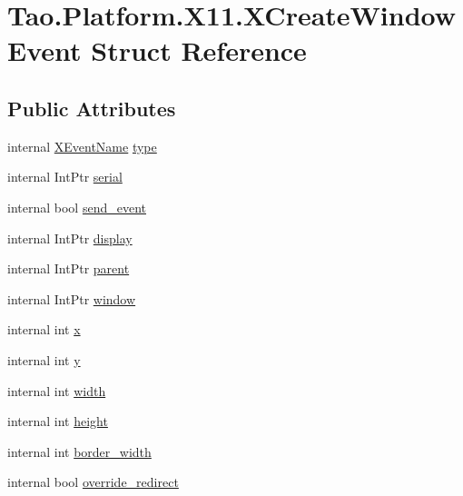\hypertarget{struct_tao_1_1_platform_1_1_x11_1_1_x_create_window_event}{
\section{Tao.Platform.X11.XCreateWindowEvent Struct Reference}
\label{struct_tao_1_1_platform_1_1_x11_1_1_x_create_window_event}
}
\subsection*{Public Attributes}
\begin{DoxyCompactItemize}
\item 
internal \hyperlink{namespace_tao_1_1_platform_1_1_x11_aff81ed5b8778e1ea8e872861dff9f146}{XEventName} \hyperlink{struct_tao_1_1_platform_1_1_x11_1_1_x_create_window_event_a7f7b06b3214897db284d5ca44d7a7d05}{type}
\item 
internal IntPtr \hyperlink{struct_tao_1_1_platform_1_1_x11_1_1_x_create_window_event_acad3d5de8c2db4d3997f5d864d4844cc}{serial}
\item 
internal bool \hyperlink{struct_tao_1_1_platform_1_1_x11_1_1_x_create_window_event_aaeb611c7a917225dee50fc422c9afcdb}{send\_\-event}
\item 
internal IntPtr \hyperlink{struct_tao_1_1_platform_1_1_x11_1_1_x_create_window_event_ac25a67459791e961e1ff906835dbcea1}{display}
\item 
internal IntPtr \hyperlink{struct_tao_1_1_platform_1_1_x11_1_1_x_create_window_event_a704a971a3fec34c9bda129fa63fd2d5e}{parent}
\item 
internal IntPtr \hyperlink{struct_tao_1_1_platform_1_1_x11_1_1_x_create_window_event_a3bfe28bf2cb14358e726ae7d5f4df991}{window}
\item 
internal int \hyperlink{struct_tao_1_1_platform_1_1_x11_1_1_x_create_window_event_ae2887d9ab88086aaeac655a0ac17d82a}{x}
\item 
internal int \hyperlink{struct_tao_1_1_platform_1_1_x11_1_1_x_create_window_event_ad0814c3f574061aa9f6eafe6e74c2c3a}{y}
\item 
internal int \hyperlink{struct_tao_1_1_platform_1_1_x11_1_1_x_create_window_event_aacf292b8ddc0715e2327e465c1e1e1bf}{width}
\item 
internal int \hyperlink{struct_tao_1_1_platform_1_1_x11_1_1_x_create_window_event_ae056f03fc62746bb3e04097237632e52}{height}
\item 
internal int \hyperlink{struct_tao_1_1_platform_1_1_x11_1_1_x_create_window_event_a5bcfbdd776c614a25facda426ff5c275}{border\_\-width}
\item 
internal bool \hyperlink{struct_tao_1_1_platform_1_1_x11_1_1_x_create_window_event_a8f1a5a273675fee615d71ebfc28323be}{override\_\-redirect}
\end{DoxyCompactItemize}


